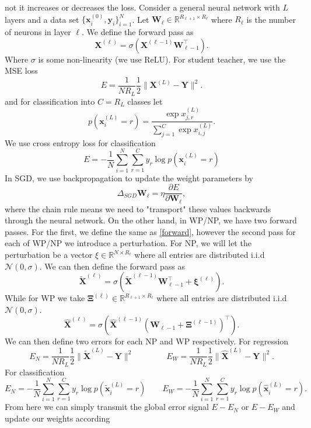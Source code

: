 \documentclass{article}
\def\R{\mathbb{R}}
\def\*#1{\mathbf{#1}}
\begin{document}
 not it increases or decreases
the loss. Consider a general neural network with $L$ layers and a data set $\{\*x_i^{(0)},\*y_i\}_{i=1}^N$. 
Let $\*W_{\ell} \in \R^{R_{\ell+1} \times R_{\ell}}$ where $R_\ell$ is the number of 
neurons in layer $\ell$. We define the forward pass as
\begin{equation}\label{forward}\*X^{(\ell)} = \sigma\left( \*X^{(\ell-1)}\*W_{\ell-1}^\top\right).\end{equation}
Where $\sigma$ is some non-linearity (we use ReLU). For student teacher, we use the MSE loss 
\begin{equation}
\label{mseloss}
E = \frac{1}{NR_L}\frac 12 \| \*X^{(L)}- \*Y\|^2.
\end{equation}
and for classification into $C = R_L$ classes let 
\begin{equation}
\label{crossentropy}
p(\*x_i^{(L)} = r) = \frac{\exp x_{j,r}^{(L)}}{\sum_{j=1}^C \exp x_{i,j}^{(L)}}.
\end{equation}
We use cross entropy loss for classification
\[E = -\frac 1N \sum_{i=1}^N \sum_{r=1}^C y_r \log p(\*x_i^{(L)} = r) \]
In SGD, we use backpropagation to update the weight parameters by 
\[\Delta_{SGD} \* W_{\ell} = \eta\frac{\partial E}{\partial \*W_{\ell}},\] 
where the chain rule means we 
need to "transport" these values backwards through the neural network. On the other 
hand, in WP/NP, we have two forward passes. For the first, we define the same as \ref{forward}, 
however the second pass for each of WP/NP we introduce a perturbation. For NP, we will let the 
perturbation be a vector $\xi \in \R^{N\times R_{\ell}}$ where all entries are distributed 
i.i.d $\mathcal{N}(0,\sigma)$. We can then define the forward pass as 
\[ \widetilde{\*X}^{(\ell)} = \sigma\left(\widetilde{\*X}^{(\ell-1)}\*W_{\ell -1}^\top + \*\xi^{(\ell)} \right).\]
While for WP we take $\*\Xi^{(\ell)} \in \R^{R_{\ell + 1 }\times R_\ell}$ where all entries are distributed 
i.i.d $\mathcal{N}(0,\sigma)$. 
\[ \hat{\*X}^{(\ell)} = \sigma\left( \hat{\*X}^{(\ell-1)}\left(\*W_{\ell -1} + \*\Xi^{(\ell-1)}\right)^\top  \right).\]
We can then define two errors for each NP and WP respectively. For regression
\[ E_N = \frac{1}{NR_L} \frac 12 \| \widetilde{\* X}^{(L)} - \* Y \|^2 \qquad\qquad E_W = \frac{1}{NR_L} \frac 12 \| \hat{\* X}^{(L)} - \* Y \|^2. \]
For classification
\[E_N  =  -\frac 1N \sum_{i=1}^N \sum_{r=1}^C y_r \log p(\widetilde{\*x}_i^{(L)} = r) \qquad E_W =  -\frac 1N \sum_{i=1}^N \sum_{r=1}^C y_r \log p(\hat{\*x}_i^{(L)} = r).\]
From here we can simply transmit the global error signal $E-E_N$ or $E-E_W$ and update our weights according
\end{document}
